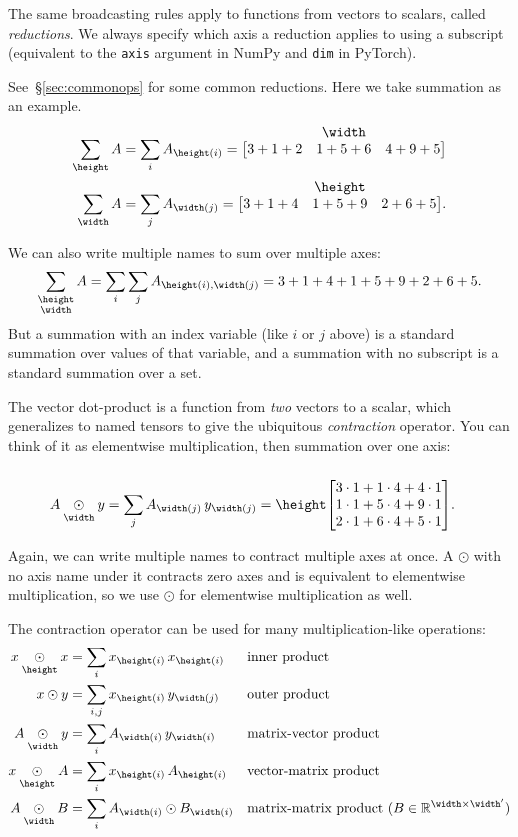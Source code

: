 \documentclass{article}
\makeatletter
\newcommand{\nmatrix}[3]{#1\begin{array}[b]{@{}c@{}}#2\\\begin{bmatrix}#3\end{bmatrix}\end{array}}
\newcommand{\reals}{\mathbb{R}}
\makeatother
\begin{document}
The same broadcasting rules apply to functions from vectors to scalars, called \emph{reductions}. We always specify which axis a reduction applies to using a subscript (equivalent to the \verb|axis| argument in NumPy and \verb|dim| in PyTorch).

See~\S\ref{sec:commonops} for some common reductions. Here we take summation as an example.
\begin{align*}
\nsum{\height} A &= \sum_i A_{\height(i)} = \nmatrix{}{\width}{
  3+1+2 & 1+5+6 & 4+9+5
}
\\
\nsum{\width} A &= \sum_j A_{\width(j)} = \nmatrix{}{\height}{
  3+1+4 & 1+5+9 & 2+6+5
}.
\end{align*}

We can also write multiple names to sum over multiple axes:
\begin{equation*}
  \nsum{\height \\ \width} A = \sum_i \sum_j A_{\height(i),\width(j)} = 3+1+4+1+5+9+2+6+5.
\end{equation*}
But a summation with an index variable (like $i$ or $j$ above) is a standard summation over values of that variable, and a summation with no subscript is a standard summation over a set.

The vector dot-product is a function from \emph{two} vectors to a scalar, which generalizes to named tensors to give the ubiquitous \emph{contraction} operator. You can think of it as elementwise multiplication, then summation over one axis:
\begin{align*}
A \ndot{\width} y &= \sum_j A_{\width(j)} \, y_{\width(j)} = \nmatrix{\height}{}{
  3\cdot1 + 1\cdot4 + 4\cdot1 \\
  1\cdot1 + 5\cdot4 + 9\cdot1 \\
  2\cdot1 + 6\cdot4 + 5\cdot1
}.
\end{align*}

Again, we can write multiple names to contract multiple axes at once. A $\odot$ with no axis name under it contracts zero axes and is equivalent to elementwise multiplication, so we use $\odot$ for elementwise multiplication as well.

The contraction operator can be used for many multiplication-like operations:
\begin{align*}
  x \ndot{\height} x &= \sum_i x_{\height(i)} \, x_{\height(i)} && \text{inner product} \\
  x \odot y &= \sum_{i,j} x_{\height(i)} \, y_{\width(j)} && \text{outer product} \\
  A \ndot{\width} y &= \sum_i A_{\width(i)} \, y_{\width(i)} && \text{matrix-vector product} \\
  x \ndot{\height} A &= \sum_i x_{\height(i)} \, A_{\height(i)} && \text{vector-matrix product} \\
  A \ndot{\width} B &= \sum_i A_{\width(i)} \odot B_{\width(i)} && \text{matrix-matrix product}~(B \in \reals^{\width \times \width'})
\end{align*}
\end{document}
